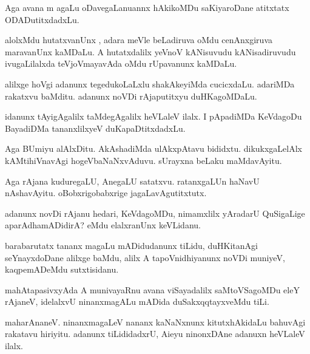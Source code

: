 \documentclass{article}
\begin{document}
\begin{mn}%
Aga avana m agaLu oDavegaLanuannx hAkikoMDu saKiyaroDane atitxtatx ODADutitxdadxLu.
\end{mn}

\begin{mn}%
alolxMdu hutatxvanUnx , adara meVle beLadiruva oMdu cenAnxgiruva maravanUnx kaMDaLu. A 
hutatxdalilx yeVnoV kANisuvudu kANisadiruvudu ivugaLilalxda teVjoVmayavAda oMdu rUpavanunx 
kaMDaLu.
\end{mn}

\begin{mn}%
alilxge hoVgi adanunx tegedukoLaLxlu shakAkeyiMda cucicxdaLu. adariMDa rakatxvu baMditu. 
adanunx noVDi rAjaputitxyu duHKagoMDaLu.
\end{mn}

\begin{mn}%
idanunx tAyigAgalilx taMdegAgalilx heVLaleV ilalx. I pApadiMDa KeVdagoDu BayadiDMa 
tananxlilxyeV duKapaDtitxdadxLu.
\end{mn}

\begin{mn}%
Aga BUmiyu alAlxDitu. AkAshadiMda ulAkxpAtavu bididxtu. dikukxgaLelAlx kAMtihiVnavAgi 
hogeVbaNaNxvAduvu. sUrayxna beLaku maMdavAyitu.
\end{mn}

\begin{mn}%
Aga rAjana kuduregaLU, AnegaLU satatxvu. ratanxgaLUn haNavU nAshavAyitu. oBobxrigobabxrige 
jagaLavAgutitxtutx.
\end{mn}

\begin{mn}%
adanunx novDi rAjanu hedari, KeVdagoMDu, nimamxlilx yAradarU QuSigaLige aparAdhamADidirA? 
eMdu elalxranUnx keVLidanu.
\end{mn}

\begin{mn}%
barabarutatx tananx magaLu mADidudanunx tiLidu, duHKitanAgi seYnayxdoDane alilxge baMdu, 
alilx A tapoVnidhiyanunx noVDi muniyeV, kaqpemADeMdu sutxtisidanu.
\end{mn}

\begin{mn}%
mahAtapasivxyAda A munivayaRnu avana viSayadalilx saMtoVSagoMDu eleY rAjaneV, idelalxvU 
ninanxmagALu mADida duSakxqqtayxveMdu tiLi.
\end{mn}

\begin{mn}%
maharAnaneV. ninanxmagaLeV nananx kaNaNxnunx kitutxhAkidaLu bahuvAgi rakatavu hiriyitu. 
adanunx tiLididadxrU, Aieyu ninonxDAne adanuxn heVLaleV ilalx.
\end{mn}
\end{document}
